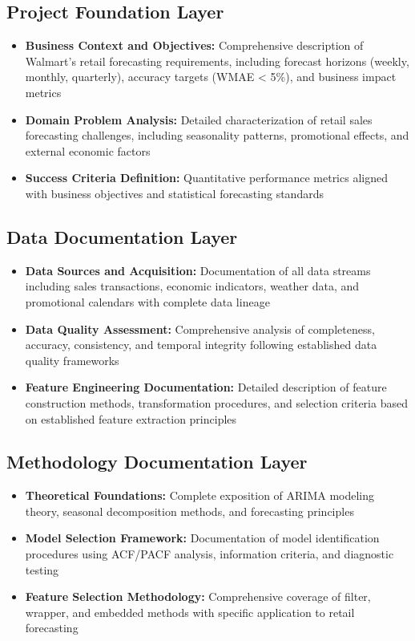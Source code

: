 \subsection{Project Foundation Layer}
\begin{itemize}
	\item \textbf{Business Context and Objectives:} Comprehensive description of Walmart's retail forecasting requirements, including forecast horizons (weekly, monthly, quarterly), accuracy targets (WMAE < 5\%), and business impact metrics
	\item \textbf{Domain Problem Analysis:} Detailed characterization of retail sales forecasting challenges, including seasonality patterns, promotional effects, and external economic factors
	\item \textbf{Success Criteria Definition:} Quantitative performance metrics aligned with business objectives and statistical forecasting standards
\end{itemize}

\subsection{Data Documentation Layer}
\begin{itemize}
	\item \textbf{Data Sources and Acquisition:} Documentation of all data streams including sales transactions, economic indicators, weather data, and promotional calendars with complete data lineage
	\item \textbf{Data Quality Assessment:} Comprehensive analysis of completeness, accuracy, consistency, and temporal integrity following established data quality frameworks
	\item \textbf{Feature Engineering Documentation:} Detailed description of feature construction methods, transformation procedures, and selection criteria based on established feature extraction principles \cite{Guyon:2003}
\end{itemize}

\subsection{Methodology Documentation Layer}
\begin{itemize}
	\item \textbf{Theoretical Foundations:} Complete exposition of ARIMA modeling theory, seasonal decomposition methods, and forecasting principles \cite{Box:2016}
	\item \textbf{Model Selection Framework:} Documentation of model identification procedures using ACF/PACF analysis, information criteria, and diagnostic testing
	\item \textbf{Feature Selection Methodology:} Comprehensive coverage of filter, wrapper, and embedded methods with specific application to retail forecasting \cite{Guyon:2003}
\end{itemize}


